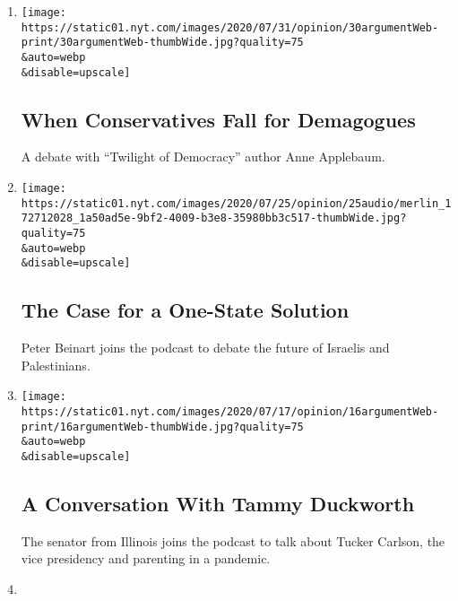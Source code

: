 \begin{enumerate}
\def\labelenumi{\arabic{enumi}.}
\item
  \href{/2020/07/30/opinion/the-argument-authoritarianism-anne-applebaum.html}{}

  \texttt{[image: https://static01.nyt.com/images/2020/07/31/opinion/30argumentWeb-print/30argumentWeb-thumbWide.jpg?quality=75\\\&auto=webp\\\&disable=upscale]}

  \hypertarget{when-conservatives-fall-for-demagogues}{%
  \subsection{When Conservatives Fall for
  Demagogues}\label{when-conservatives-fall-for-demagogues}}

  A debate with ``Twilight of Democracy'' author Anne Applebaum.
\item
  \href{/2020/07/23/opinion/the-argument-israel-palestinian.html}{}

  \texttt{[image: https://static01.nyt.com/images/2020/07/25/opinion/25audio/merlin\_172712028\_1a50ad5e-9bf2-4009-b3e8-35980bb3c517-thumbWide.jpg?quality=75\\\&auto=webp\\\&disable=upscale]}

  \hypertarget{the-case-for-a-one-state-solution}{%
  \subsection{The Case for a One-State
  Solution}\label{the-case-for-a-one-state-solution}}

  Peter Beinart joins the podcast to debate the future of Israelis and
  Palestinians.
\item
  \href{/2020/07/16/opinion/the-argument-tammy-duckworth.html}{}

  \texttt{[image: https://static01.nyt.com/images/2020/07/17/opinion/16argumentWeb-print/16argumentWeb-thumbWide.jpg?quality=75\\\&auto=webp\\\&disable=upscale]}

  \hypertarget{a-conversation-with-tammy-duckworth}{%
  \subsection{A Conversation With Tammy
  Duckworth}\label{a-conversation-with-tammy-duckworth}}

  The senator from Illinois joins the podcast to talk about Tucker
  Carlson, the vice presidency and parenting in a pandemic.
\item
  \href{/2020/07/09/opinion/is-trumps-fate-sealed.html}{}


\end{enumerate}
